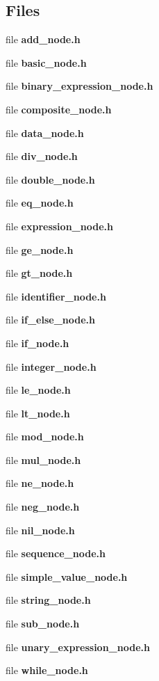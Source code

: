 \subsection*{Files}
\begin{DoxyCompactItemize}
\item 
file {\bfseries add\+\_\+node.\+h}
\item 
file {\bfseries basic\+\_\+node.\+h}
\item 
file {\bfseries binary\+\_\+expression\+\_\+node.\+h}
\item 
file {\bfseries composite\+\_\+node.\+h}
\item 
file {\bfseries data\+\_\+node.\+h}
\item 
file {\bfseries div\+\_\+node.\+h}
\item 
file {\bfseries double\+\_\+node.\+h}
\item 
file {\bfseries eq\+\_\+node.\+h}
\item 
file {\bfseries expression\+\_\+node.\+h}
\item 
file {\bfseries ge\+\_\+node.\+h}
\item 
file {\bfseries gt\+\_\+node.\+h}
\item 
file {\bfseries identifier\+\_\+node.\+h}
\item 
file {\bfseries if\+\_\+else\+\_\+node.\+h}
\item 
file {\bfseries if\+\_\+node.\+h}
\item 
file {\bfseries integer\+\_\+node.\+h}
\item 
file {\bfseries le\+\_\+node.\+h}
\item 
file {\bfseries lt\+\_\+node.\+h}
\item 
file {\bfseries mod\+\_\+node.\+h}
\item 
file {\bfseries mul\+\_\+node.\+h}
\item 
file {\bfseries ne\+\_\+node.\+h}
\item 
file {\bfseries neg\+\_\+node.\+h}
\item 
file {\bfseries nil\+\_\+node.\+h}
\item 
file {\bfseries sequence\+\_\+node.\+h}
\item 
file {\bfseries simple\+\_\+value\+\_\+node.\+h}
\item 
file {\bfseries string\+\_\+node.\+h}
\item 
file {\bfseries sub\+\_\+node.\+h}
\item 
file {\bfseries unary\+\_\+expression\+\_\+node.\+h}
\item 
file {\bfseries while\+\_\+node.\+h}
\end{DoxyCompactItemize}
